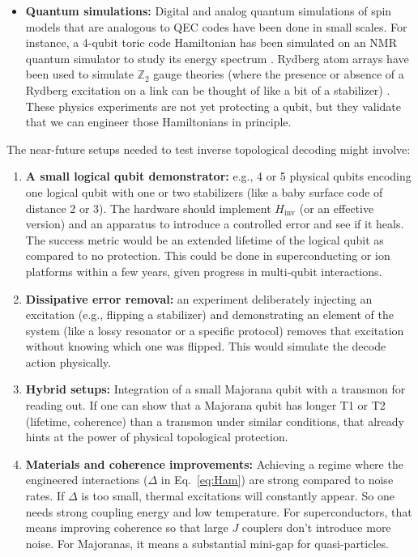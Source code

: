 \documentclass[11pt]{article}
\begin{document}
\begin{itemize}
    \item \textbf{Quantum simulations:} Digital and analog quantum simulations of spin models that are analogous to QEC codes have been done in small scales. For instance, a 4-qubit toric code Hamiltonian has been simulated on an NMR quantum simulator to study its energy spectrum \cite{Lu2017NMR}. Rydberg atom arrays have been used to simulate $\mathbb{Z}_2$ gauge theories (where the presence or absence of a Rydberg excitation on a link can be thought of like a bit of a stabilizer) \cite{Homeier2023Ry}. These physics experiments are not yet protecting a qubit, but they validate that we can engineer those Hamiltonians in principle.
\end{itemize}

The near-future setups needed to test inverse topological decoding might involve:
\begin{enumerate}
    \item \textbf{A small logical qubit demonstrator:} e.g., 4 or 5 physical qubits encoding one logical qubit with one or two stabilizers (like a baby surface code of distance 2 or 3). The hardware should implement $H_{\mathrm{inv}}$ (or an effective version) and an apparatus to introduce a controlled error and see if it heals. The success metric would be an extended lifetime of the logical qubit as compared to no protection. This could be done in superconducting or ion platforms within a few years, given progress in multi-qubit interactions.
    \item \textbf{Dissipative error removal:} an experiment deliberately injecting an excitation (e.g., flipping a stabilizer) and demonstrating an element of the system (like a lossy resonator or a specific protocol) removes that excitation without knowing which one was flipped. This would simulate the decode action physically.
    \item \textbf{Hybrid setups:} Integration of a small Majorana qubit with a transmon for reading out. If one can show that a Majorana qubit has longer T1 or T2 (lifetime, coherence) than a transmon under similar conditions, that already hints at the power of physical topological protection.
    \item \textbf{Materials and coherence improvements:} Achieving a regime where the engineered interactions ($\Delta$ in Eq.~\ref{eq:Ham}) are strong compared to noise rates. If $\Delta$ is too small, thermal excitations will constantly appear. So one needs strong coupling energy and low temperature. For superconductors, that means improving coherence so that large $J$ couplers don't introduce more noise. For Majoranas, it means a substantial mini-gap for quasi-particles.
\end{enumerate}
\end{document}
